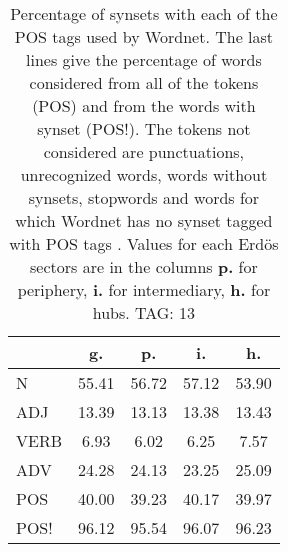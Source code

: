 \begin{table}[h!]
\begin{center}
\begin{tabular}{| l || c | c | c | c |}\hline
 & {\bf g.} & {\bf p.} & {\bf i.} & {\bf h.} \\\hline\hline
N & 55.41  & 56.72  & 57.12  & 53.90 \\\hline
ADJ & 13.39  & 13.13  & 13.38  & 13.43 \\\hline
VERB & 6.93  & 6.02  & 6.25  & 7.57 \\\hline
ADV & 24.28  & 24.13  & 23.25  & 25.09 \\\hline\hline
POS & 40.00  & 39.23  & 40.17  & 39.97 \\\hline
POS! & 96.12  & 95.54  & 96.07  & 96.23 \\\hline
\end{tabular}
\caption{Percentage of synsets with each of the POS tags used by Wordnet. The last lines give the percentage of words considered from all of the tokens (POS) and from the words with synset (POS!). The tokens not considered are punctuations, unrecognized words, words without synsets, stopwords and words for which Wordnet has no synset  tagged with POS tags . Values for each Erd\"os sectors are in the columns {{\bf p.}} for periphery, {{\bf i.}} for intermediary, {{\bf h.}} for hubs. TAG: 13}
\end{center}
\end{table}